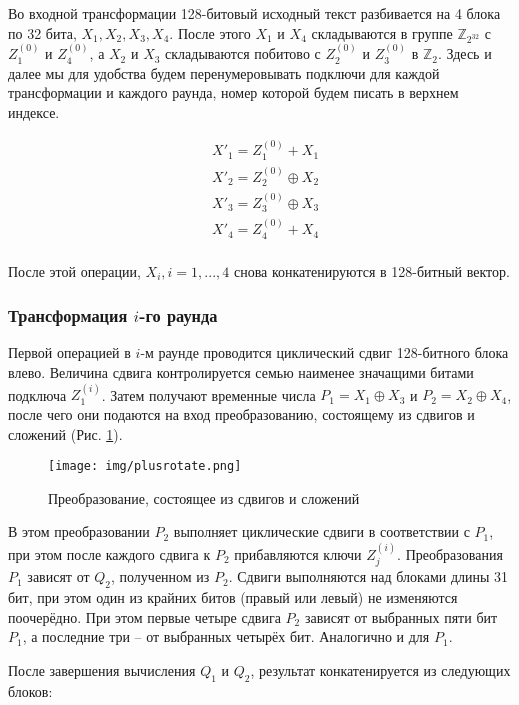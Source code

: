 \documentclass[12pt, a4paper]{article}
\begin{document}
Во входной трансформации 128-битовый исходный текст разбивается на 4 блока по 32 бита, $X_1, X_2, X_3, X_4$. 
После этого $X_1$ и $X_4$ складываются в группе $\mathds{Z}_{2^{32}}$ с $Z_1^{(0)}$ и $Z_4^{(0)}$, а $X_2$ и $X_3$ складываются побитово с $Z_2^{(0)}$ и $Z_3^{(0)}$ в $\mathds{Z}_2$. Здесь и далее мы для удобства будем перенумеровывать подключи для каждой трансформации и каждого раунда, номер которой будем писать в верхнем индексе. 

\begin{equation}
\begin{split}
& X'_1 = Z_1^{(0)} + X_1 \\
& X'_2 = Z_2^{(0)} \oplus X_2 \\
& X'_3 = Z_3^{(0)} \oplus X_3 \\
& X'_4 = Z_4^{(0)} + X_4 \\
\end{split}
\end{equation}

После этой операции, $X_i, i = 1, ..., 4$ снова конкатенируются в 128-битный вектор.

\subsubsection{Трансформация $i$-го раунда}

Первой операцией в $i$-м раунде проводится циклический сдвиг 128-битного блока влево. Величина сдвига контролируется семью наименее значащими битами подключа $Z_1^{(i)}$. Затем получают временные числа $P_1 = X_1 \oplus X_3$ и $P_2 = X_2 \oplus X_4$, после чего они подаются на вход преобразованию, состоящему из сдвигов и сложений (Рис. \ref{pic:1}).

\begin{figure}[h] 
\texttt{[image: img/plusrotate.png]}
\caption{Преобразование, состоящее из сдвигов и сложений}
\label{pic:1}
\end{figure}

В этом преобразовании $P_2$ выполняет циклические сдвиги в соответствии с $P_1$, при этом после каждого сдвига к $P_2$ прибавляются ключи $Z_j^{(i)}$. Преобразования $P_1$ зависят от $Q_2$, полученном из $P_2$. Сдвиги выполняются над блоками длины 31 бит, при этом один из крайних битов (правый или левый) не изменяются поочерёдно. При этом первые четыре сдвига $P_2$ зависят от выбранных пяти бит $P_1$, а последние три -- от выбранных четырёх бит. Аналогично и для $P_1$.

После завершения вычисления $Q_1$ и $Q_2$, результат конкатенируется из следующих блоков:
\end{document}
